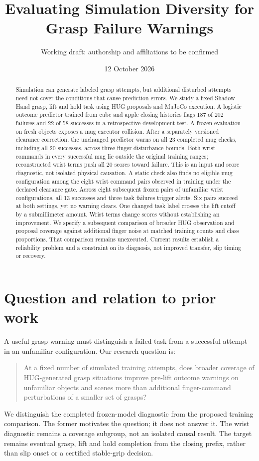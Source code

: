 \documentclass[10pt,letterpaper]{article}
\title{Evaluating Simulation Diversity for Grasp Failure Warnings}
\author{Working draft: authorship and affiliations to be confirmed}
\date{12 October 2026}
\begin{document}
\maketitle

\begin{abstract}
Simulation can generate labeled grasp attempts, but additional disturbed attempts
need not cover the conditions that cause prediction errors. We study a fixed
Shadow Hand grasp, lift and hold task using HUG proposals and MuJoCo execution.
A logistic outcome predictor trained from cube and apple closing histories
flags 187 of 202 failures and 22 of 58 successes in a retrospective development
test. A frozen evaluation on fresh objects exposes a mug executor collision.
After a separately versioned clearance correction, the unchanged predictor
warns on all 23 completed mug checks, including all 20 successes, across three
finger disturbance bounds. Both wrist commands in every successful mug lie
outside the original training ranges; reconstructed wrist terms push all 20
scores toward failure. This is an input and score diagnostic, not isolated
physical causation. A static check also finds no eligible mug configuration
among the eight wrist command pairs observed in training under the declared
clearance gate. Across eight subsequent frozen pairs of unfamiliar wrist
configurations, all 13 successes and three task failures trigger alerts.
Six pairs succeed at both settings, yet no warning clears. One changed task
label crosses the lift cutoff by a submillimeter amount. Wrist terms change
scores without establishing an improvement. We
specify a subsequent comparison of broader HUG observation and proposal coverage against
additional finger noise at matched training counts and class proportions.
That comparison remains unexecuted. Current results establish a reliability
problem and a constraint on its diagnosis, not improved transfer, slip timing
or recovery.
\end{abstract}

\section{Question and relation to prior work}
A useful grasp warning must distinguish a failed task from a successful attempt
in an unfamiliar configuration. Our research question is:
\begin{quote}
At a fixed number of simulated training attempts, does broader coverage of
HUG-generated grasp situations improve pre-lift outcome warnings on unfamiliar
objects and scenes more than additional finger-command perturbations of a
smaller set of grasps?
\end{quote}
We distinguish the completed frozen-model diagnostic from the proposed training
comparison. The former motivates the question; it does not answer it.
The wrist diagnostic remains a coverage subgroup, not an isolated causal result.
The target remains eventual grasp, lift and hold completion from the closing
prefix, rather than slip onset or a certified stable-grip decision.
\end{document}
